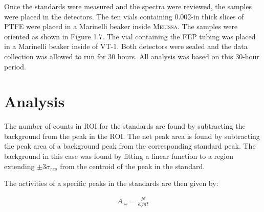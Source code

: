 Once the standards were measured and the spectra were reviewed, the samples were placed in the detectors.  The ten vials containing 0.002-in thick slices of PTFE were placed in a Marinelli beaker inside \textsc{Melissa}.  The samples were oriented as shown in Figure 1.7.  The vial containing the FEP tubing was placed in a Marinelli beaker inside of VT-1.  Both detectors were sealed and the data collection was allowed to run for 30 hours.  All analysis was based on this 30-hour period.

\section{Analysis}



The number of counts in ROI for the standards are found by subtracting the background from the peak in the ROI.  The net peak area is found by subtracting the peak area of a background peak from the corresponding standard peak.  The background in this case was found by fitting a linear function to a region extending $\pm$3$\sigma_{res}$ from the centroid of the peak in the standard.  

The activities of a specific peaks in the standards are then given by:

\begin{eqnarray}
A_{\gamma s} = \frac{N}{\epsilon_\gamma m t}
\end{eqnarray}

